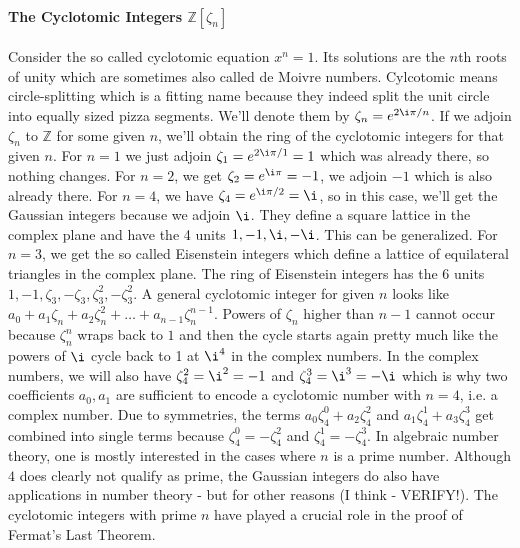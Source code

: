 \paragraph{The Cyclotomic Integers $\mathbb{Z}[\zeta_n]$}
Consider the so called cyclotomic equation $x^n = 1$. Its solutions are the $n$th roots of unity which are sometimes also called de Moivre numbers. Cylcotomic means circle-splitting which is a fitting name because they indeed split the unit circle into equally sized pizza segments. We'll denote them by $\zeta_n = e^{2 \i \pi / n}$.  If we adjoin $\zeta_n$ to $\mathbb{Z}$ for some given $n$, we'll obtain the ring of the cyclotomic integers for that given $n$. For $n=1$ we just adjoin $\zeta_1 = e^{2 \i \pi / 1} = 1$ which was already there, so nothing changes. For $n=2$, we get $\zeta_2 = e^{\i \pi} = -1$, we adjoin $-1$ which is also already there. For $n=4$, we have $\zeta_4 = e^{\i \pi / 2} = \i$, so in this case, we'll get the Gaussian integers because we adjoin $\i$. They define a square lattice in the complex plane and have the 4 units $1,-1,\i,-\i$. This can be generalized. For $n=3$, we get the so called Eisenstein integers which define a lattice of equilateral triangles in the complex plane. The ring of Eisenstein integers has the 6 units $1, -1, \zeta_3, -\zeta_3, \zeta_3^2, -\zeta_3^2$. A general cyclotomic integer for given $n$ looks like $a_0 + a_1 \zeta_n + a_2 \zeta_n^2 + \ldots + a_{n-1} \zeta_n^{n-1}$. Powers of $\zeta_n$ higher than $n-1$ cannot occur because $\zeta_n^n$ wraps back to $1$ and then the cycle starts again pretty much like the powers of $\i$ cycle back to 1 at $\i^4$ in the complex numbers. In the complex numbers, we will also have $\zeta_4^2 = \i^2 = -1$ and $\zeta_4^3 = \i^3 = -\i$ which is why two coefficients $a_0, a_1$ are sufficient to encode a cyclotomic number with $n=4$, i.e. a complex number. Due to symmetries, the terms $a_0 \zeta_4^0 + a_2 \zeta_4^2$ and $a_1 \zeta_4^1 + a_3 \zeta_4^3$ get combined into single terms because $\zeta_4^0 = -\zeta_4^2$ and $\zeta_4^1 = -\zeta_4^3$. In algebraic number theory, one is mostly interested in the cases where $n$ is a prime number. Although $4$ does clearly not qualify as prime, the Gaussian integers do also have applications in number theory - but for other reasons (I think - VERIFY!). The cyclotomic integers with prime $n$ have played a crucial role in the proof of Fermat's Last Theorem.


